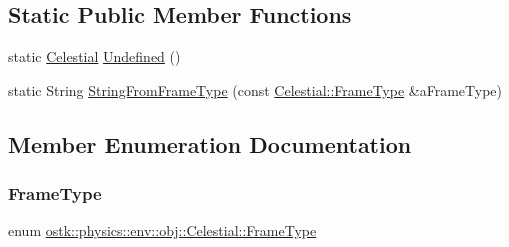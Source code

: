 \subsection*{Static Public Member Functions}
\begin{DoxyCompactItemize}
\item 
static \hyperlink{classostk_1_1physics_1_1env_1_1obj_1_1_celestial}{Celestial} \hyperlink{classostk_1_1physics_1_1env_1_1obj_1_1_celestial_ac27c062b04fa867e79c635dfd21808ca}{Undefined} ()
\item 
static String \hyperlink{classostk_1_1physics_1_1env_1_1obj_1_1_celestial_a6002c77288a58a9c523c667036a23164}{String\+From\+Frame\+Type} (const \hyperlink{classostk_1_1physics_1_1env_1_1obj_1_1_celestial_ad005258cdc5969759c8a516fb1cfd262}{Celestial\+::\+Frame\+Type} \&a\+Frame\+Type)
\end{DoxyCompactItemize}


\subsection{Member Enumeration Documentation}
\mbox{\label{classostk_1_1physics_1_1env_1_1obj_1_1_celestial_ad005258cdc5969759c8a516fb1cfd262}} 
\subsubsection{\texorpdfstring{Frame\+Type}{FrameType}}
{\footnotesize\ttfamily enum \hyperlink{classostk_1_1physics_1_1env_1_1obj_1_1_celestial_ad005258cdc5969759c8a516fb1cfd262}{ostk\+::physics\+::env\+::obj\+::\+Celestial\+::\+Frame\+Type}\hspace{0.3cm}{\ttfamily [strong]}}

